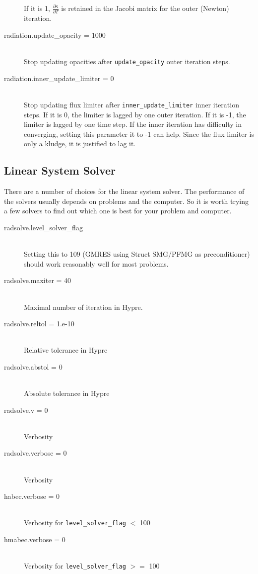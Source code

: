 \documentclass[11pt,letterpaper]{article}
\begin{document}
\begin{description}
  If it is 1, $\frac{\partial \kappa}{\partial T}$ is retained in the
  Jacobi matrix for the outer (Newton) iteration.
\item[radiation.update\_opacity = 1000] \hfill \\
  Stop updating opacities after {\tt update\_opacity} outer iteration steps.
\item[radiation.inner\_update\_limiter = 0] \hfill \\
  Stop updating flux limiter after {\tt inner\_update\_limiter} inner
  iteration steps.  If it is 0, the limiter is lagged by one outer
  iteration.  If it is -1, the limiter is lagged by one time step.  If
  the inner iteration has difficulty in converging, setting this
  parameter it to -1 can help.  Since the flux limiter is only a
  kludge, it is justified to lag it.
\end{description}


\subsection{Linear System Solver}
\label{sec:hypre}

There are a number of choices for the linear system solver.  The
performance of the solvers usually depends on problems and the
computer.  So it is worth trying a few solvers to find out which one
is best for your problem and computer.

\begin{description}
\item[radsolve.level\_solver\_flag] \hfill \\
  Setting this to 109 (GMRES using Struct SMG/PFMG as preconditioner)
  should work reasonably well for most problems.
\item[radsolve.maxiter = 40] \hfill \\
  Maximal number of iteration in Hypre.
\item[radsolve.reltol = 1.e-10] \hfill \\
  Relative tolerance in Hypre
\item[radsolve.abstol = 0] \hfill \\
  Absolute tolerance in Hypre
\item[radsolve.v = 0] \hfill \\
  Verbosity
\item[radsolve.verbose = 0] \hfill \\
  Verbosity
\item[habec.verbose = 0] \hfill \\
  Verbosity for {\tt level\_solver\_flag} $<$ 100
\item[hmabec.verbose = 0] \hfill \\
  Verbosity for {\tt level\_solver\_flag} $>=$ 100
\end{description}
\end{document}
